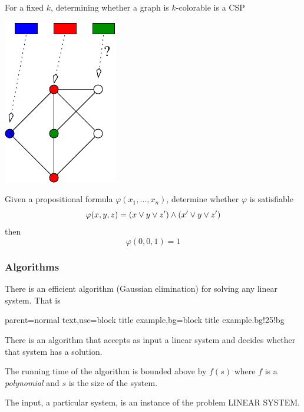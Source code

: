 \documentclass[12pt,xcolor=dvipsnames,mathserif%
   ]{beamer}
\renewcommand{\.}{\cdot}
\renewcommand{\phi}{\ensuremath{\varphi}}
\begin{document}
\begin{frame}
  For a fixed $k$, determining whether a graph is $k$-colorable is a CSP
  \begin{center}
    \includegraphics{inputs/k-col}
  \end{center}
\end{frame}


\begin{frame}
Given a propositional formula $\phi(x_1,\dots,x_n)$, determine whether $\phi$ is satisfiable
\bigskip
\begin{equation*}
\phi(x,y,z) = (x\join y \join z') \meet (x'\join y \join z')
\end{equation*}
then 
\begin{equation*}
\phi(0,0,1) = 1
\end{equation*}
\end{frame}

\begin{frame}
  \frametitle{Algorithms}
  There is an efficient algorithm (Gaussian elimination) for solving any
  linear system.
  That is

%
{parent=normal text,use=block title example,bg=block title example.bg!25!bg}
  \begin{exampleblock}{}
    There is an algorithm that accepts as input a linear system
    and decides whether that system has a solution.

    \smallskip
    The running time of the algorithm is bounded above by $f(s)$ where
    $f$ is a \emph{polynomial} and $s$ is the size of the system.
  \end{exampleblock}
  \pause

  The \alert{input}, a particular system, is an \alert{instance} of the \alert{problem}
  LINEAR SYSTEM.
  
\end{frame}
\end{document}
